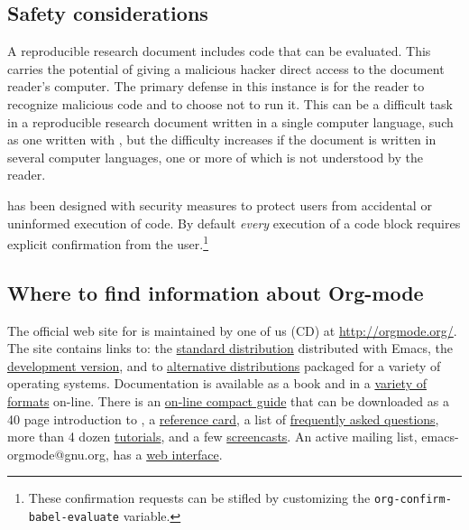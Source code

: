 \documentclass[article,shortnames]{jss}
\begin{document}
\subsection{Safety considerations}
\label{sec-3-5}

A reproducible research document includes code that can be evaluated.
This carries the potential of giving a malicious hacker direct access
to the document reader's computer.  The primary defense in this
instance is for the reader to recognize malicious code and to choose
not to run it.  This can be a difficult task in a reproducible
research document written in a single computer language, such as one
written with , but the difficulty increases if the document is
written in several computer languages, one or more of which is not
understood by the reader.

 has been designed with security measures to protect users
from accidental or uninformed execution of code.  By default \emph{every}
execution of a code block requires explicit confirmation from the
user.\footnote{These confirmation requests can be stifled by customizing
the \texttt{org-confirm-babel-evaluate} variable. }
\subsection{Where to find information about Org-mode}
\label{sec-3-6}

The official web site for  is maintained by one of us (CD) at
\href{http://orgmode.org/}{http://orgmode.org/}.  The site contains links to: the \href{http://orgmode.org/index.html#sec-3_1}{standard distribution} distributed with Emacs, the \href{http://orgmode.org/index.html#sec-3_2}{development version}, and to
\href{http://orgmode.org/index.html#sec-3_3}{alternative distributions} packaged for a variety of operating systems.
Documentation is available as a book
\citep{dominik10:_org_mode_refer_manual} and in a \href{http://orgmode.org/index.html#sec-4_1}{variety of formats}
on-line. There is an \href{http://orgmode.org/guide/index.html}{on-line compact guide} that can be downloaded as a
40 page introduction to , a \href{http://orgmode.org/orgcard.pdf}{reference card}, a list of
\href{http://orgmode.org/worg/org-faq.html}{frequently asked questions}, more than 4 dozen \href{http://orgmode.org/worg/org-tutorials/index.html}{tutorials}, and a few
\href{http://orgmode.org/worg/org-tutorials/org-screencasts/index.html}{screencasts}.  An active mailing list, emacs-orgmode@gnu.org, has a \href{http://news.gmane.org/gmane.emacs.orgmode}{web interface}.
\end{document}
